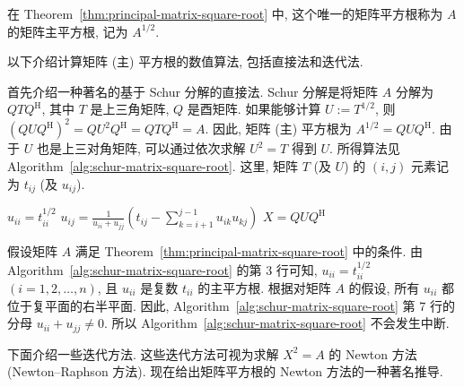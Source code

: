 {在 Theorem~\ref{thm:principal-matrix-square-root} 中, 这个唯一的矩阵平方根称为 $A$ 的矩阵主平方根, 记为 $A^{1/2}$.}

{以下介绍计算矩阵 (主) 平方根的数值算法, 包括直接法和迭代法.}

{首先介绍一种著名的基于 Schur 分解的直接法. Schur 分解是将矩阵 $A$ 分解为 $QTQ^{\mathrm H}$, 其中 $T$ 是上三角矩阵, $Q$ 是酉矩阵. 如果能够计算 $U:=T^{1/2}$, 则 $(QUQ^{\mathrm H})^2=QU^2Q^{\mathrm H}=QTQ^{\mathrm H}=A$. 因此, 矩阵 (主) 平方根为 $A^{1/2}=QUQ^{\mathrm H}$. 由于 $U$ 也是上三对角矩阵, 可以通过依次求解 $U^2=T$ 得到 $U$. 所得算法见 Algorithm~\ref{alg:schur-matrix-square-root}. 这里, 矩阵 $T$ (及 $U$) 的 $(i,j)$ 元素记为 $t_{ij}$ (及 $u_{ij}$).}

\begin{algorithm}[H]\caption{{(直接法) 求 $X=A^{1/2}$ 的 Schur 方法}}\label{alg:schur-matrix-square-root}\begin{algorithmic}[1]
\State $u_{ii}=t_{ii}^{1/2}$
\EndFor
{}
\State $u_{ij}=\frac{1}{u_{ii}+u_{jj}}(t_{ij}-\sum_{k=i+1}^{j-1}u_{ik}u_{kj})$
\EndFor
\EndFor
\State $X=QUQ^{\mathrm H}$
\end{algorithmic}\end{algorithm}

{假设矩阵 $A$ 满足 Theorem~\ref{thm:principal-matrix-square-root} 中的条件. 由 Algorithm~\ref{alg:schur-matrix-square-root} 的第 3 行可知, $u_{ii}=t_{ii}^{1/2}$ $(i=1,2,\ldots,n)$, 且 $u_{ii}$ 是复数 $t_{ii}$ 的主平方根. 根据对矩阵 $A$ 的假设, 所有 $u_{ii}$ 都位于复平面的右半平面. 因此, Algorithm~\ref{alg:schur-matrix-square-root} 第 7 行的分母 $u_{ii}+u_{jj}\ne0$. 所以 Algorithm~\ref{alg:schur-matrix-square-root} 不会发生中断.}

{下面介绍一些迭代方法. 这些迭代方法可视为求解 $X^2=A$ 的 Newton 方法 (Newton--Raphson 方法). 现在给出矩阵平方根的 Newton 方法的一种著名推导.}

